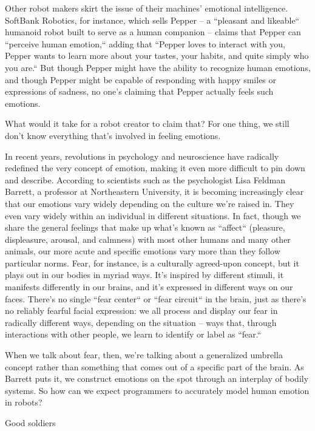 \documentclass[9pt,a4paper]{extarticle}
\makeatletter
\newlength{\newsleading}
\renewcommand{\subsection}[1]{%
  \par\addpenalty{\@secpenalty}\addvspace{\newsleading}%
  \begingroup
    \sffamily\bfseries\fontsize{8}{\newsleading}\selectfont
    \interlinepenalty=10000
    \noindent\strut #1\strut\par
  \endgroup
  \nobreak\@afterindentfalse\@afterheading
}
\makeatother
\begin{document}
Other robot makers skirt the issue of their machines’ emotional intelligence. SoftBank Robotics, for instance, which sells Pepper – a “pleasant and likeable“ humanoid robot built to serve as a human companion – claims that Pepper can “perceive human emotion,“ adding that “Pepper loves to interact with you, Pepper wants to learn more about your tastes, your habits, and quite simply who you are.“ But though Pepper might have the ability to recognize human emotions, and though Pepper might be capable of responding with happy smiles or expressions of sadness, no one’s claiming that Pepper actually feels such emotions.

What would it take for a robot creator to claim that? For one thing, we still don’t know everything that’s involved in feeling emotions.

In recent years, revolutions in psychology and neuroscience have radically redefined the very concept of emotion, making it even more difficult to pin down and describe. According to scientists such as the psychologist Lisa Feldman Barrett, a professor at Northeastern University, it is becoming increasingly clear that our emotions vary widely depending on the culture we’re raised in. They even vary widely within an individual in different situations. In fact, though we share the general feelings that make up what’s known as “affect“ (pleasure, displeasure, arousal, and calmness) with most other humans and many other animals, our more acute and specific emotions vary more than they follow particular norms. Fear, for instance, is a culturally agreed-upon concept, but it plays out in our bodies in myriad ways. It’s inspired by different stimuli, it manifests differently in our brains, and it’s expressed in different ways on our faces. There’s no single “fear center“ or “fear circuit“ in the brain, just as there’s no reliably fearful facial expression: we all process and display our fear in radically different ways, depending on the situation – ways that, through interactions with other people, we learn to identify or label as “fear.“

When we talk about fear, then, we’re talking about a generalized umbrella concept rather than something that comes out of a specific part of the brain. As Barrett puts it, we construct emotions on the spot through an interplay of bodily systems. So how can we expect programmers to accurately model human emotion in robots?

\subsection{Good soldiers}
\end{document}

